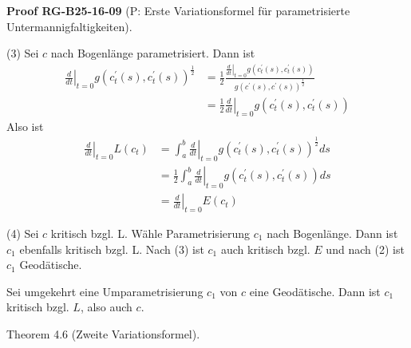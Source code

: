 \documentclass[10pt, letterpaper]{article}
\newcommand{\CustomHeading}[3]{%
  \par\medskip\noindent%
  \textbf{#1 #2} \textnormal{(#3)}.\enskip%
}
\newenvironment{PROOF}[2]{\begin{unitbox}\CustomHeading{Proof}{#1}{#2}}{\end{unitbox}}
\begin{document}
\begin{PROOF}{RG-B25-16-09}{P: Erste Variationsformel für parametrisierte Untermannigfaltigkeiten}
(3) Sei $c$ nach Bogenlänge parametrisiert. Dann ist
$$
\begin{aligned}
\left.\frac{d}{d t}\right|_{t=0} g\left(c_{t}^{\prime}(s), c_{t}^{\prime}(s)\right)^{\frac{1}{2}} & =\frac{1}{2} \frac{\left.\frac{d}{d t}\right|_{t=0} g\left(c_{t}^{\prime}(s), c_{t}^{\prime}(s)\right)}{g\left(c^{\prime}(s), c^{\prime}(s)\right)^{\frac{1}{2}}} \\
& =\left.\frac{1}{2} \frac{d}{d t}\right|_{t=0} g\left(c_{t}^{\prime}(s), c_{t}^{\prime}(s)\right)
\end{aligned}
$$
Also ist
$$
\begin{aligned}
\left.\frac{d}{d t}\right|_{t=0} L\left(c_{t}\right) & =\left.\int_{a}^{b} \frac{d}{d t}\right|_{t=0} g\left(c_{t}^{\prime}(s), c_{t}^{\prime}(s)\right)^{\frac{1}{2}} d s \\
& =\left.\frac{1}{2} \int_{a}^{b} \frac{d}{d t}\right|_{t=0} g\left(c_{t}^{\prime}(s), c_{t}^{\prime}(s)\right) d s \\
& =\left.\frac{d}{d t}\right|_{t=0} E\left(c_{t}\right)
\end{aligned}
$$


(4) Sei $c$ kritisch bzgl. L. Wähle Parametrisierung $c_{1}$ nach Bogenlänge. Dann ist $c_{1}$ ebenfalls kritisch bzgl. L. Nach (3) ist $c_{1}$ auch kritisch bzgl. $E$ und nach (2) ist $c_{1}$ Geodätische.

Sei umgekehrt eine Umparametrisierung $c_{1}$ von $c$ eine Geodätische. Dann ist $c_{1}$ kritisch bzgl. $L$, also auch $c$.
\end{PROOF}




Theorem 4.6 (Zweite Variationsformel). 
\end{document}

